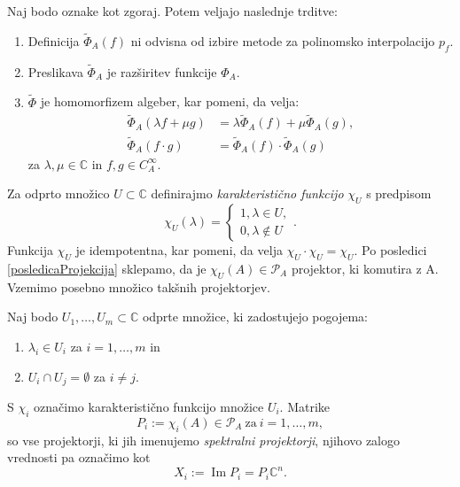 \documentclass[mat1]{fmfdelo}
\newcommand{\C}{\mathbb C}
\DeclareMathOperator{\Ima}{Im}
\begin{document}
\begin{trditev} \label{trditevPhiAlgebra}
    Naj bodo oznake kot zgoraj. Potem veljajo naslednje trditve:
    \begin{enumerate}
        \item Definicija $\widetilde{\Phi}_A(f)$ ni odvisna od izbire metode za polinomsko interpolacijo $p_f$.
        \item Preslikava $\widetilde{\Phi}_A$ je razširitev funkcije $\Phi_A$.
        \item $\widetilde{\Phi}$ je homomorfizem algeber, kar pomeni, da velja:
        \begin{align*}
            \widetilde{\Phi}_A(\lambda f + \mu g) &= \lambda \widetilde{\Phi}_A(f) + \mu \widetilde{\Phi}_A(g), \\
            \widetilde{\Phi}_A(f \cdot g) &= \widetilde{\Phi}_A(f) \cdot \widetilde{\Phi}_A(g)
        \end{align*}
        za $\lambda, \mu \in \C$ in $f, g \in C_A^\infty$.
    \end{enumerate}
\end{trditev}
Za odprto množico $U \subset \C$ definirajmo \emph{karakteristično funkcijo} $\chi_U$ s predpisom
\begin{equation*}
    \chi_U(\lambda) =
    \begin{cases}
        1, \lambda \in U, \\
        0, \lambda \notin U
    \end{cases}.
\end{equation*}
Funkcija $\chi_U$ je idempotentna, kar pomeni, da velja $\chi_U \cdot \chi_U = \chi_U$. Po posledici \ref{posledicaProjekcija} sklepamo, da je $\chi_U(A) \in \mathcal{P}_A$ projektor, ki komutira z A. Vzemimo posebno množico takšnih projektorjev.
\begin{definicija}\label{Uimnozice}
Naj bodo $U_1, \ldots, U_m \subset \C$ odprte množice, ki zadostujejo pogojema:
\begin{enumerate}
    \item $\lambda_i \in U_i$ za $i = 1,\ldots,m$ in
    \item $U_i \cap U_j = \emptyset$ za $i \neq j$.
\end{enumerate}
S $\chi_i$ označimo karakteristično funkcijo množice $U_i$. Matrike
\begin{equation} \label{definicijaProjekcije}
    P_i := \chi_i(A) \in \mathcal{P}_A\ \text{za}\ i = 1,\ldots, m,
\end{equation}
so vse projektorji, ki jih imenujemo \emph{spektralni projektorji}, njihovo zalogo vrednosti pa označimo kot 
\begin{equation} \label{zalogeProjekcij}
    X_i := \Ima P_i = P_i \C^n.
\end{equation}
\end{definicija}
\end{document}
